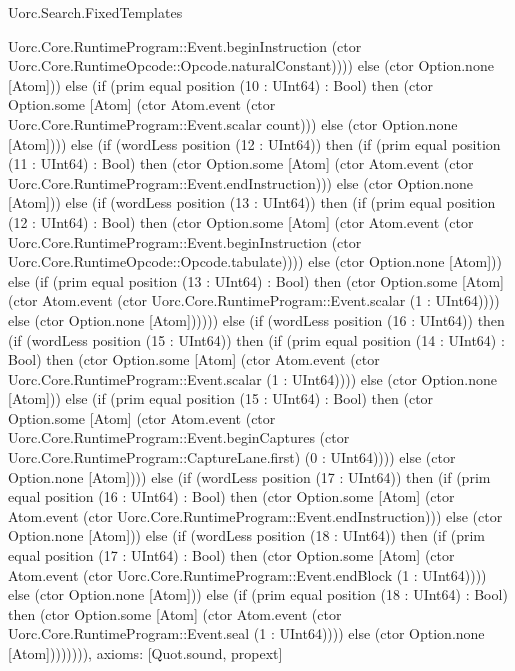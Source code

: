 \begin{lexlean}{Uorc.Search.FixedTemplates}
\begin{semanticmodule}
{Uorc.Core.RuntimeProgram::Event.beginInstruction (ctor Uorc.Core.RuntimeOpcode::Opcode.naturalConstant)))) else (ctor Option.none [Atom])) else (if (prim equal position (10 : UInt64) : Bool) then (ctor Option.some [Atom] (ctor Atom.event (ctor Uorc.Core.RuntimeProgram::Event.scalar count))) else (ctor Option.none [Atom]))) else (if (wordLess position (12 : UInt64)) then (if (prim equal position (11 : UInt64) : Bool) then (ctor Option.some [Atom] (ctor Atom.event (ctor Uorc.Core.RuntimeProgram::Event.endInstruction))) else (ctor Option.none [Atom])) else (if (wordLess position (13 : UInt64)) then (if (prim equal position (12 : UInt64) : Bool) then (ctor Option.some [Atom] (ctor Atom.event (ctor Uorc.Core.RuntimeProgram::Event.beginInstruction (ctor Uorc.Core.RuntimeOpcode::Opcode.tabulate)))) else (ctor Option.none [Atom])) else (if (prim equal position (13 : UInt64) : Bool) then (ctor Option.some [Atom] (ctor Atom.event (ctor Uorc.Core.RuntimeProgram::Event.scalar (1 : UInt64)))) else (ctor Option.none [Atom]))))) else (if (wordLess position (16 : UInt64)) then (if (wordLess position (15 : UInt64)) then (if (prim equal position (14 : UInt64) : Bool) then (ctor Option.some [Atom] (ctor Atom.event (ctor Uorc.Core.RuntimeProgram::Event.scalar (1 : UInt64)))) else (ctor Option.none [Atom])) else (if (prim equal position (15 : UInt64) : Bool) then (ctor Option.some [Atom] (ctor Atom.event (ctor Uorc.Core.RuntimeProgram::Event.beginCaptures (ctor Uorc.Core.RuntimeProgram::CaptureLane.first) (0 : UInt64)))) else (ctor Option.none [Atom]))) else (if (wordLess position (17 : UInt64)) then (if (prim equal position (16 : UInt64) : Bool) then (ctor Option.some [Atom] (ctor Atom.event (ctor Uorc.Core.RuntimeProgram::Event.endInstruction))) else (ctor Option.none [Atom])) else (if (wordLess position (18 : UInt64)) then (if (prim equal position (17 : UInt64) : Bool) then (ctor Option.some [Atom] (ctor Atom.event (ctor Uorc.Core.RuntimeProgram::Event.endBlock (1 : UInt64)))) else (ctor Option.none [Atom])) else (if (prim equal position (18 : UInt64) : Bool) then (ctor Option.some [Atom] (ctor Atom.event (ctor Uorc.Core.RuntimeProgram::Event.seal (1 : UInt64)))) else (ctor Option.none [Atom]))))))),
  axioms: [Quot.sound, propext]
}


\end{semanticmodule}
\end{lexlean}
